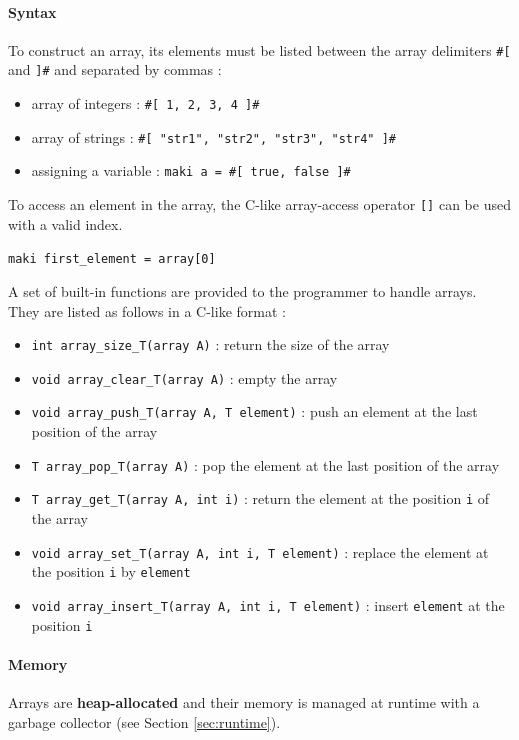 \documentclass[a4paper,11pt]{article}
\begin{document}
\paragraph{Syntax}
To construct an array, its elements must be listed between the array delimiters \texttt{\#[} and \texttt{]\#} and separated by commas  :
\begin{itemize}
	\item array of integers : \texttt{\#[ 1, 2, 3, 4 ]\#}
	\item array of strings : \texttt{\#[ "str1", "str2", "str3", "str4" ]\#}
	\item assigning a variable : \texttt{maki a = \#[ true, false ]\#}
\end{itemize}
To access an element in the array, the C-like array-access operator \texttt{[]} can be used with a valid index.
\begin{center}
	\texttt{maki first\_element = array[0]}
\end{center}
A set of built-in functions are provided to the programmer to handle arrays. They are listed as follows in a C-like format :
\begin{itemize}
	\item \texttt{int array\_size\_T(array A)} : return the size of the array
	\item \texttt{void array\_clear\_T(array A)} : empty the array
	\item \texttt{void array\_push\_T(array A, T element)} : push an element at the last position of the array
	\item \texttt{T array\_pop\_T(array A)} : pop the element at the last position of the array
	\item \texttt{T array\_get\_T(array A, int i)} : return the element at the position \texttt{i} of the array
	\item \texttt{void array\_set\_T(array A, int i, T element)} : replace the element at the position \texttt{i} by \texttt{element}
	\item \texttt{void array\_insert\_T(array A, int i, T element)} : insert \texttt{element} at the position \texttt{i}
\end{itemize}
\paragraph{Memory} Arrays are \textbf{heap-allocated} and their memory is managed at runtime with a garbage collector (see Section \ref{sec:runtime}).
\end{document}
